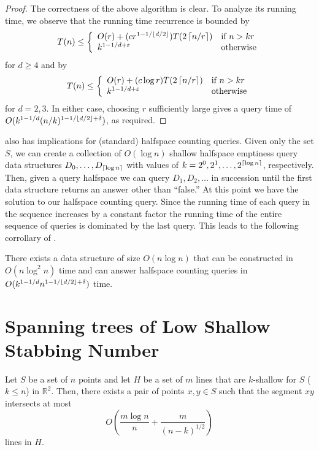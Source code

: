 \documentclass[lotsofwhite]{patmorin}
\newcommand{\eps}{\varepsilon}
\newcommand{\X}{1-1/\floor{d/2}+\delta}
\begin{document}
\begin{proof}
The correctness of the above algorithm is clear. To analyze its
running time, we observe that the running time recurrence is bounded
by
\[
   T(n) \le \left\{ \begin{array}{ll}
     O(r) + (cr^{1-1/\floor{d/2}})T(2\ceil{n/r}) & \mbox{if $n > kr$} \\
     k^{1-1/d+\eps} & \mbox{otherwise} 
   \end{array}\right.
\]
for $d\ge 4$ and by
\[
   T(n) \le \left\{ \begin{array}{ll}
     O(r) + (c\log r)T(2\ceil{n/r}) & \mbox{if $n > kr$} \\
     k^{1-1/d+\eps} & \mbox{otherwise} 
   \end{array}\right.
\]
for $d=2,3$.  
In either case, choosing $r$ sufficiently large gives a query time of
$O(k^{1-1/d}(n/k)^{\X})$, as required.
\end{proof}

 also has implications for (standard) halfspace counting
queries. Given only the set $S$, we can create a collection of $O(\log
n)$ shallow halfspace emptiness query data structures
$D_0,\ldots,D_{\left\lceil \log n \right\rceil}$ with values of
$k=2^0,2^1,\ldots,2^{\left\lceil \log n \right\rceil}$, respectively.  Then, given a
query halfspace we can query $D_1,D_2,\ldots$ in succession until the
first data structure returns an answer other than ``false.''  At this
point we have the solution to our halfspace counting query.  Since the
running time of each query in the sequence increases by a constant
factor the running time of the entire sequence of queries is dominated
by the last query. This leads to the following corrollary of
.

\begin{cor}
There exists a data structure of size $O(n\log n)$ that can be
constructed in $O(n\log^2 n)$ time and can answer
halfspace counting queries in $O(k^{1-1/d}n^{\X})$ time.
\end{cor}

\section{Spanning trees of Low Shallow Stabbing Number}

\begin{lem}
Let $S$ be a set of $n$ points and let $H$ be a set of $m$ lines that
are $k$-shallow for $S$ ($k\le n$) in $\mathbb{R}^2$.  Then, there
exists a pair of points $x,y\in S$ such that the segment $xy$
intersects at most
\[
   O\left(\frac{m\log n}{n} + \frac{m}{(n-k)^{1/2}}\right)
\]
lines in $H$.
\end{lem}
\end{document}
